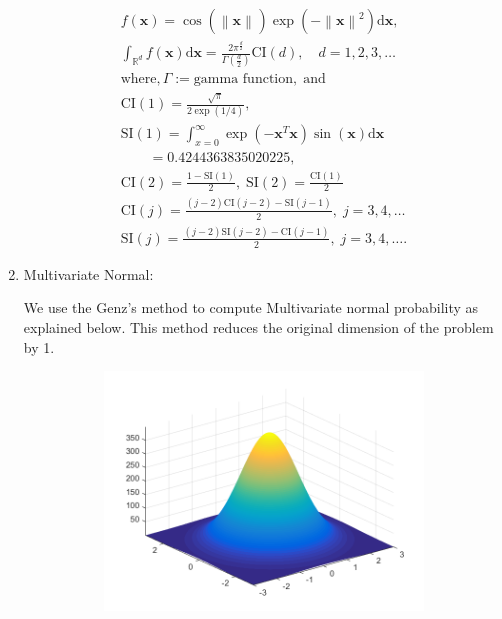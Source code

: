 \documentclass[twocolumn]{svjour3}          %
\newcommand{\bm}[1]{\boldsymbol{#1}}
\newcommand{\dif}[1]{\text{d}{#1}}
\newcommand{\reals}{\mathbb{R}}
\newcommand{\vx}{\bm{x}}
\newcommand{\dvx}{\dif{\bm{x}}}
\newcommand{\norm}[2][{}]{\ensuremath{\left \lVert #2 \right \rVert}_{#1}}
\begin{document}
\begin{enumerate}
\begin{multline*}
f(\vx) =  \cos(\norm{ \vx}) \exp(-\norm{ \vx }^2) \dvx, \;  
\\
\int_{\reals^d} f(\vx) \dvx  = \frac{2 \pi^{\frac d2}}{\Gamma(\frac d2)} \text{CI}(d), \quad d=1,2,3,\hdots
\\
\text{where}, \Gamma  := \text{gamma function}, \; \text{and}
\\
\text{CI}(1) = \frac{\sqrt{\pi}}{2 \exp(1/4)}, 
\\
\text{SI}(1) = \int_{x=0}^\infty \exp(-\vx^T\vx)\sin(\vx) \dvx 
\\
\qquad =  0.4244363835020225,
\\
\text{CI}(2) = \frac{1-\text{SI}(1)}{2}, \;
\text{SI}(2) = \frac{\text{CI}(1)}{2}
\\
\text{CI}(j) = \frac{(j-2)\text{CI}(j-2)-\text{SI}(j-1)}{2},
\; j =3,4,\hdots
\\
\text{SI}(j) = \frac{(j-2)\text{SI}(j-2)-\text{CI}(j-1)}{2},
\; j =3,4,\hdots.
\end{multline*}












\item Multivariate Normal:


We use the Genz's method to compute Multivariate normal probability as explained below. This method reduces the original dimension of the problem by 1.


\begin{figure}
\centering
\captionsetup[subfigure]{labelformat=empty}
\begin{subfigure}{0.48\textwidth}
\includegraphics[width=\textwidth]{Plotting_gaussian}
\end{subfigure}
\centering
\begin{subfigure}{0.48\textwidth}


\end{subfigure}
\end{figure}
\end{enumerate}
\end{document}
